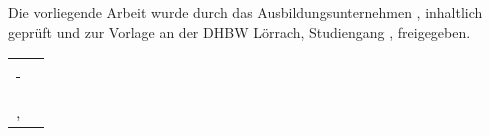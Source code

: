 \noindent Die vorliegende Arbeit wurde durch das Ausbildungsunternehmen 
\unternehmen{}, inhaltlich geprüft und zur Vorlage an der DHBW Lörrach, Studiengang \kurs, freigegeben.

\vspace*{4cm}
\begin{center}
	\begin{tabular}[h]{cc}
		\noindent\rule{7cm}{0.5pt} & \noindent\rule{7cm}{0.5pt} \\
		\noindent\ortfreigabe, \datumfreigabe & \unternehmensbetreuer
 	\end{tabular}
\end{center}
